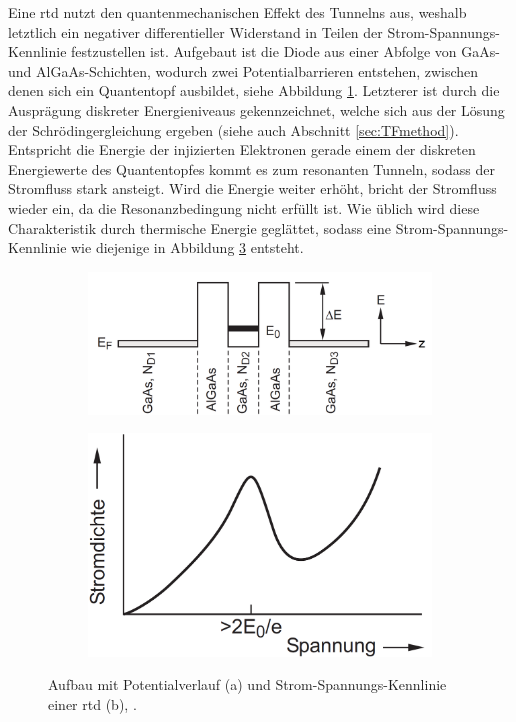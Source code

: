 Eine \ac{rtd} nutzt den quantenmechanischen Effekt des Tunnelns aus, weshalb letztlich ein negativer differentieller Widerstand in Teilen der Strom-Spannungs-Kennlinie festzustellen ist. Aufgebaut ist die Diode aus einer Abfolge von GaAs- und AlGaAs-Schichten, wodurch zwei Potentialbarrieren entstehen, zwischen denen sich ein Quantentopf ausbildet, siehe Abbildung \ref{fig:Heterostuktur}. Letzterer ist durch die Ausprägung diskreter Energieniveaus gekennzeichnet, welche sich aus der Lösung der Schrödingergleichung ergeben (siehe auch Abschnitt \ref{sec:TFmethod}). Entspricht die Energie der injizierten Elektronen gerade einem der diskreten Energiewerte des Quantentopfes kommt es zum resonanten Tunneln, sodass der Stromfluss stark ansteigt. Wird die Energie weiter erhöht, bricht der Stromfluss wieder ein, da die Resonanzbedingung nicht erfüllt ist. Wie üblich wird diese Charakteristik durch thermische Energie geglättet, sodass eine Strom-Spannungs-Kennlinie wie diejenige in Abbildung \ref{fig:IVkurve} entsteht.
\begin{figure}
    \centering
    \begin{subfigure}[b]{0.55\textwidth}
        \centering
        \includegraphics[width=\textwidth]{files/AlGaAs.png}
        \caption[]{{ }}
        \label{fig:Heterostuktur}
    \end{subfigure}
    \hfill
    \begin{subfigure}[b]{0.4\textwidth}
        \centering
        \includegraphics[width=\textwidth]{files/IVkurve.png}
        \caption[]{{ }}
        \label{fig:IVkurve}
    \end{subfigure}
    \caption[]
    {Aufbau mit Potentialverlauf (a) und Strom-Spannungs-Kennlinie einer \ac{rtd} (b), \cite{wiedenhaus}.}
\end{figure}
